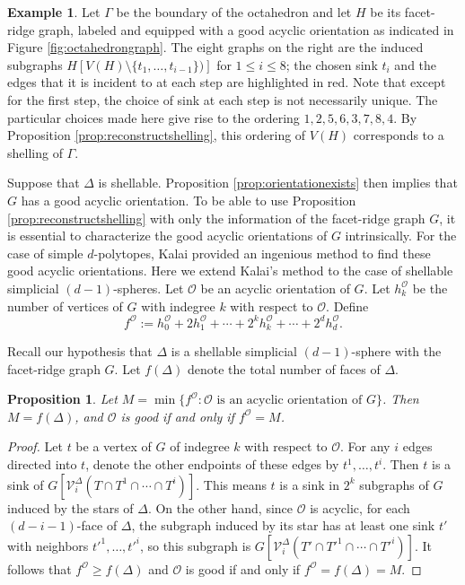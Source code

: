 \documentclass[11pt,twoside]{article}
\newtheorem{proposition}[theorem]{Proposition}
\theoremstyle{definition}
\newtheorem{example}[theorem]{Example}
\newcommand{\cO}{\mathcal{O}}
\newcommand{\cV}{\mathcal{V}}
\begin{document}
\begin{example}\label{ex:octahedrongraph}
Let $\Gamma$ be the boundary of the octahedron and let $H$ be its facet-ridge graph, labeled and equipped with a good acyclic orientation as indicated in Figure \ref{fig:octahedrongraph}. The eight graphs on the right are the induced subgraphs $H[V(H) \setminus \{t_1, \dots, t_{i-1}\})]$ for $1 \le i \le 8$; the chosen sink $t_i$ and the edges that it is incident to at each step are highlighted in red. Note that except for the first step, the choice of sink at each step is not necessarily unique. The particular choices made here give rise to the ordering $1, 2, 5, 6, 3, 7, 8, 4$. By Proposition \ref{prop:reconstructshelling}, this ordering of $V(H)$ corresponds to a shelling of $\Gamma$.
\end{example}


Suppose that $\Delta$ is shellable. Proposition \ref{prop:orientationexists} then implies that $G$ has a good acyclic orientation. To be able to use Proposition \ref{prop:reconstructshelling} with only the information of the facet-ridge graph $G$, it is essential to characterize the good acyclic orientations of $G$ intrinsically. For the case of simple $d$-polytopes, Kalai \cite{Kalai} provided an ingenious method to find these good acyclic orientations. Here we extend Kalai's method to the case of shellable simplicial $(d-1)$-spheres. Let $\cO$ be an acyclic orientation of $G$. Let $h_k^\cO$ be the number of vertices of $G$ with indegree $k$ with respect to $\cO$. Define 
\[
f^\cO := h_0^\cO + 2h_1^\cO + \cdots + 2^kh_k^\cO + \cdots + 2^dh_d^\cO.
\]

Recall our hypothesis that $\Delta$ is a shellable simplicial $(d-1)$-sphere with the facet-ridge graph $G$. Let $f(\Delta)$ denote the total number of faces of $\Delta$. 
\begin{proposition}\label{prop:findgoodorientation}
Let $M = \min \{f^\cO: \cO \text{ is an acyclic orientation of } G\}$. Then $M = f(\Delta)$, and $\cO$ is good if and only if $f^\cO = M$. 
\end{proposition}
\begin{proof}
    Let $t$ be a vertex of $G$ of indegree $k$ with respect to $\cO$. For any $i$ edges directed into $t$, denote the other endpoints of these edges by $t^1, \dots, t^i$. Then $t$ is a sink of $G[\cV^\Delta_i(T \cap T^1 \cap \cdots \cap T^i)]$. This means $t$ is a sink in $2^k$ subgraphs of $G$ induced by the stars of $\Delta$. On the other hand, since $\cO$ is acyclic, for each $(d-i-1)$-face of $\Delta$, the subgraph induced by its star has at least one sink $t'$ with neighbors $t'^1, \dots, t'^i$, so this subgraph is $G[\cV^\Delta_i(T' \cap T'^1 \cap \cdots \cap T'^i)]$. It follows that $f^\cO \ge f(\Delta)$ and $\cO$ is good if and only if $f^\cO = f(\Delta) = M$. 
\end{proof}
\end{document}
